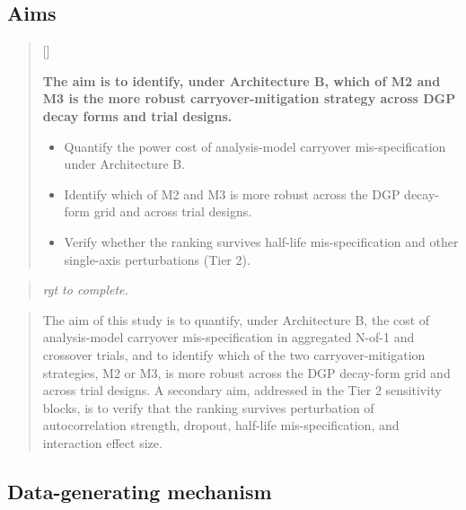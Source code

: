 \documentclass[
  11pt,
]{article}
\newcounter{pgraph}
\newenvironment{bullets}{%
  \stepcounter{pgraph}%
  \begin{quote}\small\sffamily\color[gray]{0.30}%
  {\normalfont\scriptsize\color[gray]{0.58}[\thepgraph]\enspace}}{%
  \end{quote}}
\newenvironment{rgt}{%
  \begin{quote}\small\itshape\color[RGB]{20,60,160}}{%
  \end{quote}}
\newenvironment{orig}{%
  \begin{quote}\normalsize\color[gray]{0.55}}{%
  \end{quote}}
\begin{document}
\subsection{Aims}\label{aims}

\begin{bullets}

\textbf{The aim is to identify, under Architecture B, which of M2 and
M3 is the more robust carryover-mitigation strategy across DGP decay
forms and trial designs.}

\begin{itemize}\setlength{\itemsep}{2pt}\setlength{\parskip}{0pt}
\item Quantify the power cost of analysis-model carryover
mis-specification under Architecture B.
\item Identify which of M2 and M3 is more robust across the DGP
decay-form grid and across trial designs.
\item Verify whether the ranking survives half-life mis-specification
and other single-axis perturbations (Tier 2).
\end{itemize}

\end{bullets}

\begin{rgt}
rgt to complete.

\end{rgt}

\begin{orig}
The aim of this study is to quantify, under Architecture B, the cost
of analysis-model carryover mis-specification in aggregated N-of-1
and crossover trials, and to identify which of the two
carryover-mitigation strategies, M2 or M3, is more robust across the
DGP decay-form grid and across trial designs. A secondary aim,
addressed in the Tier 2 sensitivity blocks, is to verify that the
ranking survives perturbation of autocorrelation strength, dropout,
half-life mis-specification, and interaction effect size.

\end{orig}

\subsection{Data-generating mechanism}\label{data-generating-mechanism}
\end{document}

